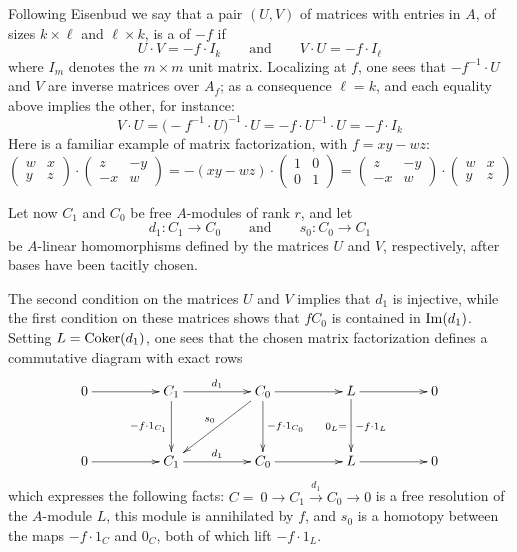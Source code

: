 Following Eisenbud \cite[Sect.\ 5]{CI:Ei} we say that a pair $(U,V)$ of
matrices with entries in $A$, of sizes $k\times \ell$ and $\ell\times
k$, is a {\it{}\/} of $-f$ if
\[
U\cdot V= -f\cdot I_k \qquad\text{and}\qquad V\cdot U=-f\cdot I_\ell
\]
where $I_m$ denotes the $m\times m$ unit matrix.  Localizing at $f$, one
sees that $-f^{-1}\cdot U$ and $V$ are inverse matrices over $A_f$; as a
consequence $\ell=k$, and each equality above implies the other, for
instance:
\[
V\cdot U=\big(-f^{-1}\cdot U\big)^{-1}\cdot U= -f\cdot U^{-1}\cdot U=
-f\cdot I_k
\]
Here is a familiar example of matrix factorization, with $f=xy-wz$:
\[
\begin{pmatrix} w & x \\ y & z \end{pmatrix}\cdot
\begin{pmatrix} z & -y \\ -x & w \end{pmatrix}=
-(xy-wz)\cdot
\begin{pmatrix} 1 & 0 \\ 0 & 1 \end{pmatrix}=
\begin{pmatrix} z & -y \\ -x & w \end{pmatrix}\cdot
\begin{pmatrix} w & x \\ y & z \end{pmatrix}
\]

Let now $C_1$ and $C_0$ be free $A$-modules of rank $r$, and let
\[
d_1\colon C_1\to C_0 \qquad\text{and}\qquad s_0\colon C_0\to C_1
\]
be $A$-linear homomorphisms defined by the matrices $U$ and $V$,
respectively, after bases have been tacitly chosen.  

The second condition on the matrices $U$ and $V$ implies that $d_1$ is
injective, while the first condition on these matrices shows that
$fC_0$ is contained in $\operatorname{Im}(d_1)$.  Setting $L=\operatorname{Coker}(d_1)$, one sees
that the chosen matrix factorization defines a commutative diagram with
exact rows
\[
\xymatrixrowsep{3pc}
\xymatrixcolsep{4pc}
\xymatrix{
0
\ar[r]
& C_1
\ar[r]^-{d_1}
\ar[d]_{-f\cdot 1_{C_1}}
& C_0
\ar[r]
\ar[d]^{-f\cdot 1_{C_0}}
\ar[dl]_-{s_0}
& L
\ar[r]
\ar[d]_{0_L=}^{-f\cdot1_L}
& 0
\\
0
\ar[r]
& C_1
\ar[r]^-{d_1}
& C_0
\ar[r]
& L
\ar[r]
& 0
}
\]
which expresses the following facts: $C=\ 0\to C_1\xrightarrow{d_1}
C_0\to 0$ is a free resolution of the $A$-module $L$,  this module is
annihilated by $f$, and $s_0$ is a homotopy between the maps
$-f\cdot 1_C$ and $0_C$, both of which lift $-f\cdot 1_L$.

